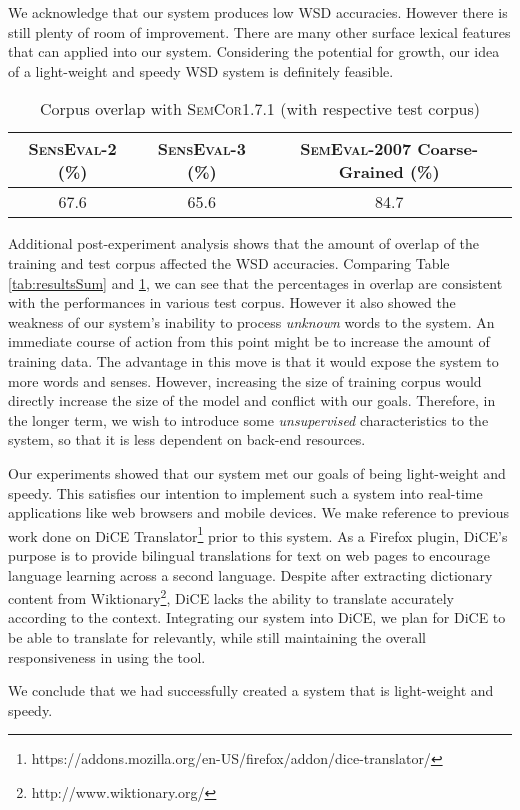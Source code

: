 \documentclass[a4paper,12pt]{nurop}
\begin{document}
We acknowledge that our system produces low WSD accuracies. However there is still plenty of room of improvement. There are many other surface lexical features that can applied into our system. Considering the potential for growth, our idea of a light-weight and speedy WSD system is definitely feasible.

\begin{table}[h]
\footnotesize
	\center
	\begin{tabular}{| c | c | c |}
		\hline
		\textsc{SensEval-2} (\%) & \textsc{SensEval-3} (\%) & \textsc{SemEval-2007} Coarse-Grained (\%) \\
		\hline
		67.6 & 65.6 & 84.7 \\
		\hline
	\end{tabular}
	\caption{Corpus overlap with \textsc{SemCor1.7.1} (with respective test corpus)}
	\label{tab:overlapPercentage}
\end{table}

Additional post-experiment analysis shows that the amount of overlap of the training and test corpus affected the WSD accuracies. Comparing Table \ref{tab:resultsSum} and \ref{tab:overlapPercentage}, we can see that the percentages in overlap are consistent with the performances in various test corpus. However it also showed the weakness of our system's inability to process \textit{unknown} words to the system. An immediate course of action from this point might be to increase the amount of training data. The advantage in this move is that it would expose the system to more words and senses. However, increasing the size of training corpus would directly increase the size of the model and conflict with our goals. Therefore, in the longer term, we wish to introduce some \textit{unsupervised} characteristics to the system, so that it is less dependent on back-end resources.

Our experiments showed that our system met our goals of being light-weight and speedy. This satisfies our intention to implement such a system into real-time applications like web browsers and mobile devices. We make reference to previous work done on DiCE Translator\footnote{https://addons.mozilla.org/en-US/firefox/addon/dice-translator/} prior to this system. As a Firefox plugin, DiCE's purpose is to provide bilingual translations for text on web pages to encourage language learning across a second language. Despite after extracting dictionary content from Wiktionary\footnote{http://www.wiktionary.org/}, DiCE lacks the ability to translate accurately according to the context. Integrating our system into DiCE, we plan for DiCE to be able to translate for relevantly, while still maintaining the overall responsiveness in using the tool.

We conclude that we had successfully created a system that is light-weight and speedy.


\end{document}

